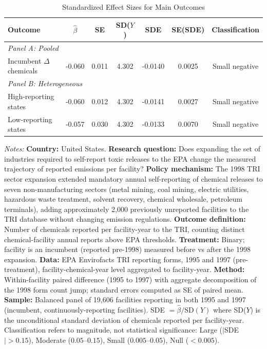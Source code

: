 \begin{table}[H]
\centering
\caption{Standardized Effect Sizes for Main Outcomes}
\label{tab:sde}
\begin{threeparttable}
\begin{tabular}{lcccccc}
\toprule
Outcome & $\hat{\beta}$ & SE & SD($Y$) & SDE & SE(SDE) & Classification \\
\midrule
\multicolumn{7}{l}{\textit{Panel A: Pooled}} \\
Incumbent $\Delta$ chemicals & -0.060 & 0.011 & 4.302 & -0.0140 & 0.0025 & Small negative \\
\midrule
\multicolumn{7}{l}{\textit{Panel B: Heterogeneous}} \\
\quad High-reporting states & -0.060 & 0.012 & 4.302 & -0.0141 & 0.0027 & Small negative \\
\quad Low-reporting states & -0.057 & 0.030 & 4.302 & -0.0133 & 0.0070 & Small negative \\
\bottomrule
\end{tabular}
\begin{tablenotes}[flushleft]
\small
\item \textit{Notes:} \textbf{Country:} United States. \textbf{Research question:} Does expanding the set of industries required to self-report toxic releases to the EPA change the measured trajectory of reported emissions per facility? \textbf{Policy mechanism:} The 1998 TRI sector expansion extended mandatory annual self-reporting of chemical releases to seven non-manufacturing sectors (metal mining, coal mining, electric utilities, hazardous waste treatment, solvent recovery, chemical wholesale, petroleum terminals), adding approximately 2,000 previously unreported facilities to the TRI database without changing emission regulations. \textbf{Outcome definition:} Number of chemicals reported per facility-year to the TRI, counting distinct chemical-facility annual reports above EPA thresholds. \textbf{Treatment:} Binary; facility is an incumbent (reported pre-1998) measured before vs after the 1998 expansion. \textbf{Data:} EPA Envirofacts TRI reporting forms, 1995 and 1997 (pre-treatment), facility-chemical-year level aggregated to facility-year. \textbf{Method:} Within-facility paired difference (1995 to 1997) with aggregate decomposition of the 1998 form count jump; standard errors computed as SE of paired mean. \textbf{Sample:} Balanced panel of 19,606 facilities reporting in both 1995 and 1997 (incumbent, continuously-reporting facilities). SDE $= \hat{\beta} / \text{SD}(Y)$ where SD($Y$) is the unconditional standard deviation of chemicals reported per facility-year. Classification refers to magnitude, not statistical significance: Large ($|$SDE$| > 0.15$), Moderate ($0.05$--$0.15$), Small ($0.005$--$0.05$), Null ($< 0.005$). 
\end{tablenotes}
\end{threeparttable}
\end{table}
